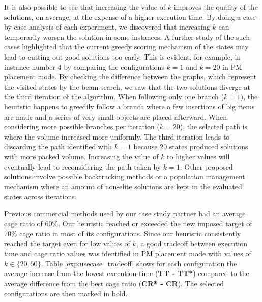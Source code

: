 It is also possible to see that increasing the value of $k$ improves the quality of the solutions, on average, at the expense of a higher execution time.
By doing a case-by-case analysis of each experiment, we discovered that increasing $k$ can temporarily worsen the solution in some instances.
A further study of the such cases highlighted that the current greedy scoring mechanism of the states may lead to cutting out good solutions too early.
This is evident, for example, in instance number 4 by comparing the configurations $k=1$ and $k=20$ in PM placement mode.
By checking the difference between the graphs, which represent the visited states by the beam-search, we saw that the two solutions diverge at the third iteration of the algorithm.
When following only one branch ($k=1$), the heuristic happens to greedily follow a branch where a few insertions of big items are made and a series of very small objects are placed afterward.
When considering more possible branches per iteration ($k=20$), the selected path is where the volume increased more uniformly. The third iteration leads to discarding the path identified with $k=1$ because 20 states produced solutions with more packed volume.
Increasing the value of $k$ to higher values will eventually lead to reconsidering the path taken by $k=1$. Other proposed solutions involve possible backtracking methods or a population management mechanism where an amount of non-elite solutions are kept in the evaluated states across iterations.

Previous commercial methods used by our case study partner had an average cage ratio of $60\%$.
Our heuristic reached or exceeded the new imposed target of $70\%$ cage ratio in most of its configurations.
Since our heuristic consistently reached the target even for low values of $k$, a good tradeoff between execution time and cage ratio values was identified in PM placement mode with values of $k \in \{ 20, 50 \}$.
Table \ref{exp:usecase_tradeoff} shows for each configuration the average increase from the lowest execution time (\textbf{TT - TT*}) compared to the average difference from the best cage ratio (\textbf{CR* - CR}).
The selected configurations are then marked in bold.
\label{exp:usecase_results}


